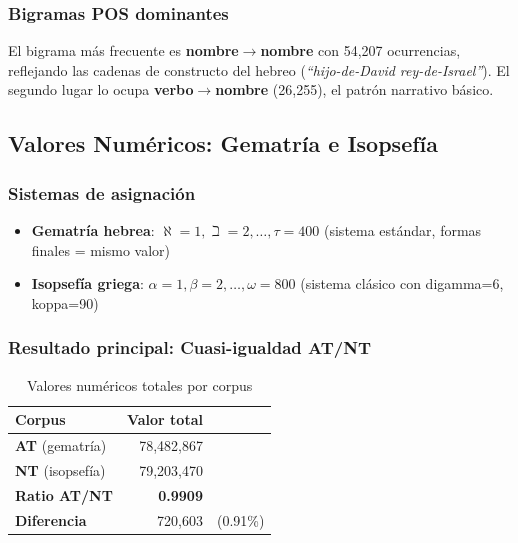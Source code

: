 \documentclass[12pt,a4paper]{article}
\newcommand{\ot}{\textcolor{otcolor}{\textbf{AT}}}
\newcommand{\nt}{\textcolor{ntcolor}{\textbf{NT}}}
\newcommand{\val}[1]{\textcolor{hlcolor}{\textbf{#1}}}
\begin{document}
\subsubsection{Bigramas POS dominantes}

El bigrama m\'as frecuente es \textbf{nombre$\to$nombre} con 54,207 ocurrencias,
reflejando las cadenas de constructo del hebreo (\emph{``hijo-de-David rey-de-Israel''}).
El segundo lugar lo ocupa \textbf{verbo$\to$nombre} (26,255), el patr\'on narrativo b\'asico.


\subsection{Valores Num\'ericos: Gematr\'ia e Isopsef\'ia}

\subsubsection{Sistemas de asignaci\'on}

\begin{itemize}[leftmargin=2em]
\item \textbf{Gematr\'ia hebrea}: $\aleph=1, \beth=2, \ldots, \tau=400$
      (sistema est\'andar, formas finales = mismo valor)
\item \textbf{Isopsef\'ia griega}: $\alpha=1, \beta=2, \ldots, \omega=800$
      (sistema cl\'asico con digamma=6, koppa=90)
\end{itemize}

\subsubsection{Resultado principal: Cuasi-igualdad AT/NT}

\begin{table}[H]
\centering
\caption{Valores num\'ericos totales por corpus}
\label{tab:numtotals}
\begin{tabular}{lrl}
\toprule
\textbf{Corpus} & \textbf{Valor total} & \\
\midrule
\ot{} (gematr\'ia)    & 78,482,867 & \\
\nt{} (isopsef\'ia)   & 79,203,470 & \\
\midrule
\textbf{Ratio AT/NT}  & \val{0.9909} & \\
\textbf{Diferencia}   & 720,603 & (0.91\%) \\
\bottomrule
\end{tabular}
\end{table}
\end{document}
